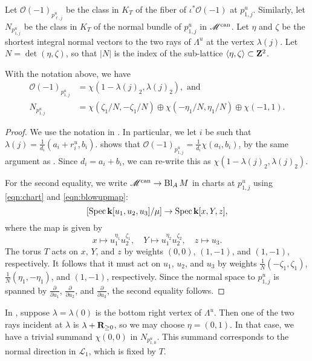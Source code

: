\documentclass{amsart}
\renewcommand{\k}{\mathbf k}
\DeclareMathOperator{\Bl}{Bl}
\renewcommand{\O}{\mathcal O}
\begin{document}
Let \(\O(-1)_{p_{\ell,j}^u}\) be the class in \(K_T\) of the fiber of \(\iota^{*}\O(-1)\) at \(p_{1,j}^u\).
Similarly, let \(N_{p_{1,j}^u}\)  be the class in \(K_T\) of the normal bundle of \(p_{1,j}^u\) in \(\mathscr M^{\rm can}\).
Let \(\eta\) and \(\zeta\) be the shortest integral normal vectors to the two rays of \(\Lambda^u\) at the vertex \(\lambda(j)\).
Let \(N = \det(\eta,\zeta)\), so that \(|N|\) is the index of the sub-lattice \(\langle \eta, \zeta \rangle \subset {\bf Z}^2\).
\begin{proposition}\label{prop:p1juall}
  With the notation above, we have
  \begin{align*}
    \O(-1)_{p_{1,j}^u} &= \chi(1-\lambda(j)_2,\lambda(j)_2), \text { and }\\
    N_{p_{1,j}^u} &= \chi(\zeta_1/N,-\zeta_1/N) \oplus \chi(-\eta_1/N,\eta_1/N) \oplus \chi(-1,1).
  \end{align*}
\end{proposition}
\begin{proof}
  We use the notation in .
  In particular, we let \(i\) be such that \(\lambda(j) = \frac{1}{d_i}(a_i+r_i^u,b_i)\).
   shows that \(\O(-1)_{p_{1,j}^u} = \frac{1}{d_i}\chi(a_i,b_i)\), by the same argument as .
  Since \(d_i = a_i+b_i\), we can re-write this as \(\chi(1-\lambda(j)_2, \lambda(j)_2)\).

  For the second equality, we write \(\mathscr M^{\rm can} \to \Bl_AM\) in charts at \(p_{1,j}^u\) using \eqref{eqn:chart} and \eqref{eqn:blowupmap}:
  \[
   [\spec \k[u_1,u_2,u_3]/\mu] \to \spec \k[x,Y,z],
 \]
 where the map is given by
 \[ x \mapsto u_1^{\eta_1}u_2^{\zeta_1}, \quad Y \mapsto u_1^{\eta_2}u_2^{\zeta_2}, \quad z \mapsto u_3.\]
 The torus \(T\) acts on \(x\), \(Y\), and \(z\) by weights \((0,0)\), \((1,-1)\), and \((1,-1)\), respectively.
 It follows that it must act on \(u_1\), \(u_2\), and \(u_3\) by weights \(\frac{1}{N}(-\zeta_1,\zeta_1)\), \(\frac{1}{N}(\eta_1,-\eta_{1})\), and \((1,-1)\), respectively.
 Since the normal space to \(p_{1,j}^u\) is spanned by \(\frac{\partial}{\partial u_1}\), \(\frac{\partial}{\partial u_2}\), and \(\frac{\partial}{\partial u_3}\), the second equality follows.
\end{proof}
\begin{remark}
    In , suppose \(\lambda = \lambda(0)\) is the bottom right vertex of \(\Lambda^u\).
    Then one of the two rays incident at \(\lambda\) is \(\lambda + {\bf R}_{\geq 0}\), so we may choose \(\eta = (0,1)\).
    In that case, we have a trivial summand \(\chi(0,0)\) in \(N_{p_{1,0}^u}\).
    This summand corresponds to the normal direction in \(\mathcal L_1\), which is fixed by \(T\).
  \end{remark}
\end{document}
